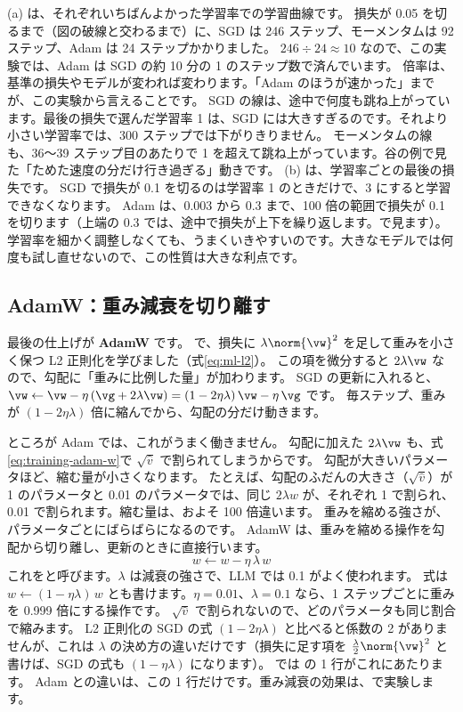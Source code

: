 (a) は、それぞれいちばんよかった学習率での学習曲線です。
損失が 0.05 を切るまで（図の破線と交わるまで）に、SGD は 246 ステップ、モーメンタムは 92 ステップ、Adam は 24 ステップかかりました。
$246\div24\approx10$ なので、この実験では、Adam は SGD の約 10 分の 1 のステップ数で済んでいます。
倍率は、基準の損失やモデルが変われば変わります。「Adam のほうが速かった」までが、この実験から言えることです。
SGD の線は、途中で何度も跳ね上がっています。最後の損失で選んだ学習率 1 は、SGD には大きすぎるのです。それより小さい学習率では、300 ステップでは下がりきりません。
モーメンタムの線も、36〜39 ステップ目のあたりで 1 を超えて跳ね上がっています。谷の例で見た「ためた速度の分だけ行き過ぎる」動きです。
(b) は、学習率ごとの最後の損失です。
SGD で損失が 0.1 を切るのは学習率 1 のときだけで、3 にすると学習できなくなります。
Adam は、0.003 から 0.3 まで、100 倍の範囲で損失が 0.1 を切ります（上端の 0.3 では、途中で損失が上下を繰り返します。で見ます）。
学習率を細かく調整しなくても、うまくいきやすいのです。大きなモデルでは何度も試し直せないので、この性質は大きな利点です。

\subsection*{AdamW：重み減衰を切り離す}

最後の仕上げが \textbf{AdamW} です\cite{loshchilov2019decoupled}。
で、損失に $\lambda\norm{\vw}^2$ を足して重みを小さく保つ L2 正則化を学びました（式\eqref{eq:ml-l2}）。
この項を微分すると $2\lambda\vw$ なので、勾配に「重みに比例した量」が加わります。
SGD の更新に入れると、$\vw\leftarrow\vw-\eta\,(\vg+2\lambda\vw)=(1-2\eta\lambda)\,\vw-\eta\,\vg$ です。
毎ステップ、重みが $(1-2\eta\lambda)$ 倍に縮んでから、勾配の分だけ動きます。

ところが Adam では、これがうまく働きません。
勾配に加えた $2\lambda\vw$ も、式\eqref{eq:training-adam-w}で $\sqrt{\hat v}$ で割られてしまうからです。
勾配が大きいパラメータほど、縮む量が小さくなります。
たとえば、勾配のふだんの大きさ（$\sqrt{\hat v}$）が 1 のパラメータと 0.01 のパラメータでは、同じ $2\lambda w$ が、それぞれ 1 で割られ、0.01 で割られます。縮む量は、およそ 100 倍違います。
重みを縮める強さが、パラメータごとにばらばらになるのです。
AdamW は、重みを縮める操作を勾配から切り離し、更新のときに直接行います。
\begin{equation}
w\leftarrow w-\eta\,\lambda\,w
\label{eq:training-weight-decay}
\end{equation}
これをと呼びます。$\lambda$ は減衰の強さで、LLM では 0.1 がよく使われます。
式は $w\leftarrow(1-\eta\lambda)\,w$ とも書けます。$\eta=0.01$、$\lambda=0.1$ なら、1 ステップごとに重みを 0.999 倍にする操作です。
$\sqrt{\hat v}$ で割られないので、どのパラメータも同じ割合で縮みます。
L2 正則化の SGD の式 $(1-2\eta\lambda)$ と比べると係数の 2 がありませんが、これは $\lambda$ の決め方の違いだけです（損失に足す項を $\frac{\lambda}{2}\norm{\vw}^2$ と書けば、SGD の式も $(1-\eta\lambda)$ になります）。
では  の 1 行がこれにあたります。
Adam との違いは、この 1 行だけです。重み減衰の効果は、で実験します。

